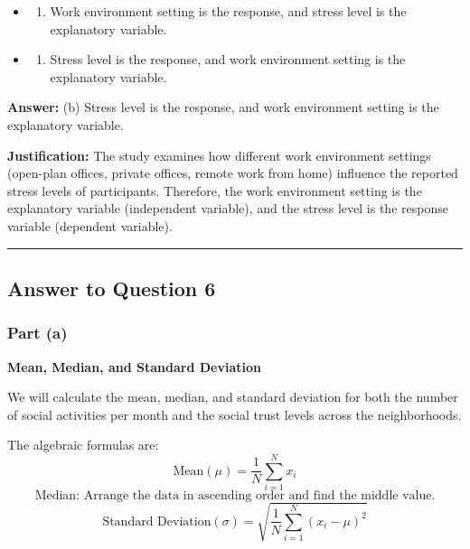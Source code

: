 \documentclass[
  11pt,
]{article}
\providecommand{\tightlist}{%
  \setlength{\itemsep}{0pt}\setlength{\parskip}{0pt}}
\begin{document}
\begin{itemize}
\tightlist
\item
  \begin{enumerate}
  \def\labelenumi{(\alph{enumi})}
  \tightlist
  \item
    Work environment setting is the response, and stress level is the
    explanatory variable.
  \end{enumerate}
\item
  \begin{enumerate}
  \def\labelenumi{(\alph{enumi})}
  \setcounter{enumi}{1}
  \tightlist
  \item
    Stress level is the response, and work environment setting is the
    explanatory variable.
  \end{enumerate}
\end{itemize}

\textbf{Answer:} (b) Stress level is the response, and work environment
setting is the explanatory variable.

\textbf{Justification:} The study examines how different work
environment settings (open-plan offices, private offices, remote work
from home) influence the reported stress levels of participants.
Therefore, the work environment setting is the explanatory variable
(independent variable), and the stress level is the response variable
(dependent variable).

\hrule

\subsection{Answer to Question 6}\label{answer-to-question-6}

\subsubsection{Part (a)}\label{part-a}

\textbf{Mean, Median, and Standard Deviation}

We will calculate the mean, median, and standard deviation for both the
number of social activities per month and the social trust levels across
the neighborhoods.

The algebraic formulas are: \[
   \text{Mean} (\mu) = \frac{1}{N} \sum_{i=1}^{N} x_i
   \] \[
   \text{Median: Arrange the data in ascending order and find the middle value.}
   \] \[
   \text{Standard Deviation} (\sigma) = \sqrt{\frac{1}{N} \sum_{i=1}^{N} (x_i - \mu)^2}
   \]
\end{document}
